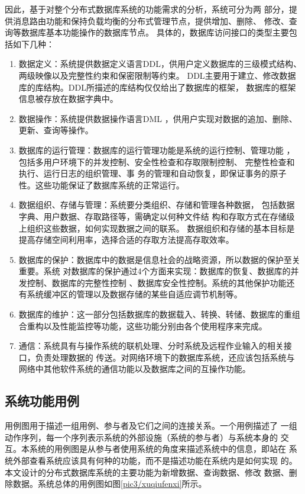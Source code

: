 	因此，基于对整个分布式数据库系统的功能需求的分析，系统可分为两
	部分，提供消息路由功能和保持负载均衡的分布式管理节点，提供增加、删除、
	修改、查询等数据库基本功能操作的数据库节点。
具体的，数据库访问接口的类型主要包括如下几种：
\begin{enumerate}
	\item 数据定义：系统提供数据定义语言DDL，供用户定义数据库的三级模式结构、两级映像以及完整性约束和保密限制等约束。
	DDL主要用于建立、修改数据库的库结构。DDL所描述的库结构仅仅给出了数据库的框架，
	数据库的框架信息被存放在数据字典中。
	\item 数据操作：系统提供数据操作语言DML
	，供用户实现对数据的追加、删除、更新、查询等操作。
	\item 数据库的运行管理：数据库的运行管理功能是系统的运行控制、管理功能
	，包括多用户环境下的并发控制、安全性检查和存取限制控制、
	完整性检查和执行、运行日志的组织管理、事
	务的管理和自动恢复，即保证事务的原子性。这些功能保证了数据库系统的正常运行。
	\item 数据组织、存储与管理：系统要分类组织、存储和管理各种数据，
	包括数据字典、用户数据、存取路径等，需确定以何种文件结
	构和存取方式在存储级上组织这些数据，如何实现数据之间的联系。
	数据组织和存储的基本目标是提高存储空间利用率，选择合适的存取方法提高存取效率。
	\item   数据库的保护：数据库中的数据是信息社会的战略资源，所以数据的保护至关重要。系统
	对数据库的保护通过4个方面来实现：数据库的恢复、数据库的并发控制、数据库的完整性控制
	、数据库安全性控制。系统的其他保护功能还有系统缓冲区的管理以及数据存储的某些自适应调节机制等。
	\item  数据库的维护：这一部分包括数据库的数据载入、转换、转储、数据库的重组合重构以及性能监控等功能，这些功能分别由各个使用程序来完成。
	\item 通信：系统具有与操作系统的联机处理、分时系统及远程作业输入的相关接口，负责处理数据的
	传送。对网络环境下的数据库系统，还应该包括系统与网络中其他软件系统的通信功能以及数据库之间的互操作功能。
\end{enumerate}
\subsection{系统功能用例}
用例图用于描述一组用例、参与者及它们之间的连接关系。一个用例描述了
一组动作序列，每一个序列表示系统的外部设施（系统的参与者）与系统本身的
交互。本系统的用例图是从参与者使用系统的角度来描述系统中的信息，即站在
系统外部查看系统应该具有何种的功能，而不是描述功能在系统内是如何实现
的。本文设计的分布式数据库系统的主要功能为新增数据、查询数据、修改
数据、删除数据。系统总体的用例图如图\ref{pic3/xuqiufenxi}所示。

